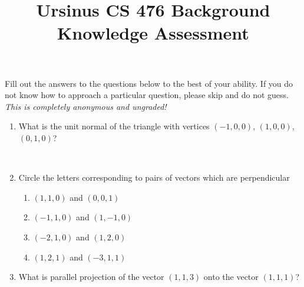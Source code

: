 \documentclass{article}
\title{Ursinus CS 476 Background Knowledge Assessment }
\date{\vspace{-5ex}}
\begin{document}
\begin{spacing}{1.1}

\maketitle

Fill out the answers to the questions below to the best of your ability.  If you do not know how to approach a particular question, please skip and do not guess.  {\em This is completely anonymous and ungraded!}

\begin{enumerate}

\item %

What is the unit normal of the triangle with vertices $(-1, 0, 0)$, $(1, 0, 0)$, $(0, 1, 0)$?
\begin{description}
\item[] \leavevmode \\ 
\end{description}

\item %

Circle the letters corresponding to pairs of vectors which are perpendicular

\begin{enumerate}[label=\alph*.]

\item %

$(1, 1, 0)$ and $(0, 0, 1)$

\item

$(-1, 1, 0)$ and $(1, -1, 0)$ %

\item 

$(-2, 1, 0)$ and $(1, 2, 0)$ %

\item

$(1, 2, 1)$ and $(-3, 1, 1)$ %

\end{enumerate}

\item
What is parallel projection of the vector $(1, 1, 3)$ onto the vector $(1, 1, 1)$?  %

\begin{description}
\item[] \leavevmode \\ \\ \\ \\
\end{description}



\end{enumerate}
\end{spacing}
\end{document}
